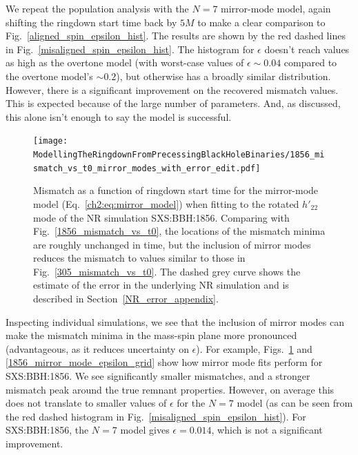 We repeat the population analysis with the $N=7$ mirror-mode model, again shifting the ringdown start time back by $5M$ to make a clear comparison to Fig.~\ref{aligned_spin_epsilon_hist}. 
The results are shown by the red dashed lines in Fig.~\ref{misaligned_spin_epsilon_hist}. The histogram for $\epsilon$ doesn't reach values as high as the overtone model (with worst-case values of $\epsilon \sim 0.04$ compared to the overtone model's $\sim 0.2$), but otherwise has a broadly similar distribution.
However, there is a significant improvement on the recovered mismatch values. This is expected because of the large number of parameters. And, as discussed, this alone isn't enough to say the model is successful.

\begin{figure}[t]
    \centering
    \texttt{[image: ModellingTheRingdownFromPrecessingBlackHoleBinaries/1856\_mismatch\_vs\_t0\_mirror\_modes\_with\_error\_edit.pdf]}
    \caption[Mismatch for the mirror-mode model fitted to SXS:BBH:1856]{
    Mismatch as a function of ringdown start time for the mirror-mode model (Eq.~\ref{ch2:eq:mirror_model}) when fitting to the rotated $h'_{22}$ mode of the NR simulation SXS:BBH:1856.
    Comparing with Fig.~\ref{1856_mismatch_vs_t0}, the locations of the mismatch minima are roughly unchanged in time, but the inclusion of mirror modes reduces the mismatch to values similar to those in Fig.~\ref{305_mismatch_vs_t0}. The dashed grey curve shows the estimate of the error in the underlying NR simulation and is described in Section~\ref{NR_error_appendix}.
    }
    \label{1856_mirror_mode_mismatch_vs_t0}
\end{figure}

Inspecting individual simulations, we see that the inclusion of mirror modes can make the mismatch minima in the mass-spin plane more pronounced (advantageous, as it reduces uncertainty on $\epsilon$). For example, Figs.~\ref{1856_mirror_mode_mismatch_vs_t0} and \ref{1856_mirror_mode_epsilon_grid} show how mirror mode fits perform for SXS:BBH:1856. 
We see significantly smaller mismatches, and a stronger mismatch peak around the true remnant properties. However, on average this does not translate to smaller values of $\epsilon$ for the $N=7$ model (as can be seen from the red dashed histogram in Fig.~\ref{misaligned_spin_epsilon_hist}). For SXS:BBH:1856, the $N=7$ model gives $\epsilon = 0.014$, which is not a significant improvement.

